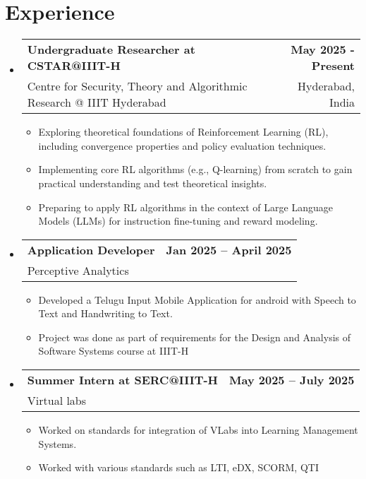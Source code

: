 \documentclass[a4paper,10pt]{article}
\makeatletter
\newcommand{\resumeItem}[1]{\item[\textcolor{bulletcolor}{\textbullet}] \small{#1}}
\newcommand{\resumeSubheading}[4]{
  \vspace{-2pt}\item
    \begin{tabular*}{0.97\textwidth}[t]{l@{\extracolsep{\fill}}r}
      \textbf{#1} & \textbf{\small #2} \\
      {\small #3} & {\small #4} \\
    \end{tabular*}\vspace{-7pt}
}
\makeatother
\begin{document}
\section{Experience}
\begin{itemize}[leftmargin=0.15in, label={}]
      \resumeSubheading{Undergraduate Researcher at CSTAR@IIIT-H}{May 2025 - Present}{Centre for Security, Theory and Algorithmic Research @ IIIT Hyderabad}{Hyderabad, India}
    \begin{itemize}[leftmargin=*, itemsep=0pt]
        
\resumeItem{Exploring theoretical foundations of Reinforcement Learning (RL), including convergence properties and policy evaluation techniques.}
    \resumeItem{Implementing core RL algorithms (e.g., Q-learning) from scratch to gain practical understanding and test theoretical insights.}
    \resumeItem{Preparing to apply RL algorithms in the context of Large Language Models (LLMs) for instruction fine-tuning and reward modeling.}
       
    \end{itemize}
  
        
    \resumeSubheading
        {Application Developer}{Jan 2025 -- April 2025}
        {Perceptive Analytics}{}
        \begin{itemize}[leftmargin=0.15in]
            \resumeItem{Developed a Telugu Input Mobile Application for android with Speech to Text and Handwriting to Text.}
            \resumeItem{Project was done as part of requirements for the Design and Analysis of Software Systems course at IIIT-H}
        \end{itemize}
    
    \resumeSubheading
        {Summer Intern at SERC@IIIT-H}{May 2025 -- July 2025}
        {Virtual labs}{}
        \begin{itemize}[leftmargin=0.15in]
            \resumeItem{Worked on standards for integration of VLabs into Learning Management Systems.}
            \resumeItem{Worked with various standards such as LTI, eDX, SCORM, QTI}
        \end{itemize}
\end{itemize}

\end{document}
